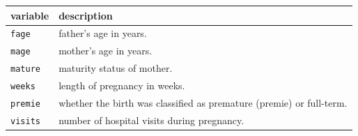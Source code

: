 \documentclass[]{book}
\theoremstyle{definition}
\theoremstyle{definition}
\theoremstyle{definition}
\theoremstyle{remark}
\begin{document}
\begin{longtable}[]{@{}ll@{}}
\toprule
\begin{minipage}[b]{0.56\columnwidth}\raggedright
variable\strut
\end{minipage} & \begin{minipage}[b]{0.38\columnwidth}\raggedright
description\strut
\end{minipage}\tabularnewline
\midrule
\endhead
\begin{minipage}[t]{0.56\columnwidth}\raggedright
\texttt{fage}\strut
\end{minipage} & \begin{minipage}[t]{0.38\columnwidth}\raggedright
father's age in years.\strut
\end{minipage}\tabularnewline
\begin{minipage}[t]{0.56\columnwidth}\raggedright
\texttt{mage}\strut
\end{minipage} & \begin{minipage}[t]{0.38\columnwidth}\raggedright
mother's age in years.\strut
\end{minipage}\tabularnewline
\begin{minipage}[t]{0.56\columnwidth}\raggedright
\texttt{mature}\strut
\end{minipage} & \begin{minipage}[t]{0.38\columnwidth}\raggedright
maturity status of mother.\strut
\end{minipage}\tabularnewline
\begin{minipage}[t]{0.56\columnwidth}\raggedright
\texttt{weeks}\strut
\end{minipage} & \begin{minipage}[t]{0.38\columnwidth}\raggedright
length of pregnancy in weeks.\strut
\end{minipage}\tabularnewline
\begin{minipage}[t]{0.56\columnwidth}\raggedright
\texttt{premie}\strut
\end{minipage} & \begin{minipage}[t]{0.38\columnwidth}\raggedright
whether the birth was classified as premature (premie) or
full-term.\strut
\end{minipage}\tabularnewline
\begin{minipage}[t]{0.56\columnwidth}\raggedright
\texttt{visits}\strut
\end{minipage} & \begin{minipage}[t]{0.38\columnwidth}\raggedright
number of hospital visits during pregnancy.\strut
\end{minipage}\tabularnewline

\end{longtable}
\end{document}
